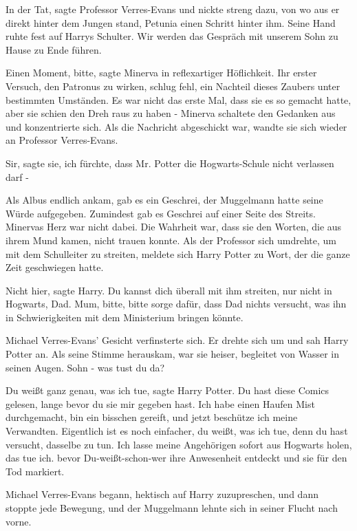 \glqq{}In der Tat\grqq{}, sagte Professor Verres-Evans und nickte streng dazu,
von wo aus er direkt hinter dem Jungen stand, Petunia einen Schritt hinter ihm.
Seine Hand ruhte fest auf Harrys Schulter. \glqq{}Wir werden das Gespräch mit
unserem Sohn zu Hause zu Ende führen.\grqq{}

\glqq{}Einen Moment, bitte\grqq{}, sagte Minerva in reflexartiger Höflichkeit.
Ihr erster Versuch, den Patronus zu wirken, schlug fehl, ein Nachteil dieses
Zaubers unter bestimmten Umständen. Es war nicht das erste Mal, dass sie es so
gemacht hatte, aber sie schien den Dreh raus zu haben - Minerva schaltete den
Gedanken aus und konzentrierte sich. Als die Nachricht abgeschickt war, wandte
sie sich wieder an Professor Verres-Evans.

\glqq{}Sir\grqq{}, sagte sie, \glqq{}ich fürchte, dass Mr. Potter die
Hogwarts-Schule nicht verlassen darf -\grqq{}

Als Albus endlich ankam, gab es ein Geschrei, der Muggelmann hatte seine Würde
aufgegeben. Zumindest gab es Geschrei auf einer Seite des Streits. Minervas Herz
war nicht dabei. Die Wahrheit war, dass sie den Worten, die aus ihrem Mund
kamen, nicht trauen konnte. Als der Professor sich umdrehte, um mit dem
Schulleiter zu streiten, meldete sich Harry Potter zu Wort, der die ganze Zeit
geschwiegen hatte.

\glqq{}Nicht hier\grqq{}, sagte Harry. \glqq{}Du kannst dich überall mit ihm
streiten, nur nicht in Hogwarts, Dad. Mum, bitte, bitte sorge dafür, dass Dad
nichts versucht, was ihn in Schwierigkeiten mit dem Ministerium bringen
könnte.\grqq{}

Michael Verres-Evans' Gesicht verfinsterte sich. Er drehte sich um und sah Harry
Potter an. Als seine Stimme herauskam, war sie heiser, begleitet von Wasser in
seinen Augen. \glqq{}Sohn - was tust du da?\grqq{}

\glqq{}Du weißt ganz genau, was ich tue\grqq{}, sagte Harry Potter. \glqq{}Du hast
diese Comics gelesen, lange bevor du sie mir gegeben hast. Ich habe einen Haufen
Mist durchgemacht, bin ein bisschen gereift, und jetzt beschütze ich meine
Verwandten. Eigentlich ist es noch einfacher, du weißt, was ich tue, denn du
hast versucht, dasselbe zu tun. Ich lasse meine Angehörigen sofort aus Hogwarts
holen, das tue ich. bevor Du-weißt-schon-wer ihre Anwesenheit entdeckt und sie
für den Tod markiert.\grqq{}

Michael Verres-Evans begann, hektisch auf Harry zuzupreschen, und dann stoppte
jede Bewegung, und der Muggelmann lehnte sich in seiner Flucht nach vorne.

